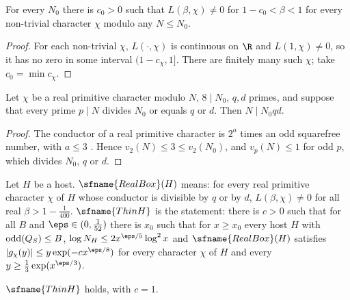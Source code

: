 \begin{lemma}\label{pf:top-supply:smallzeros}
For every $N_0$ there is $c_0>0$ such that $L(\beta,\chi)\ne0$ for $1-c_0<\beta<1$ for every non-trivial character $\chi$
modulo any $N\le N_0$. 
\end{lemma}

\begin{proof}
For each non-trivial $\chi$, $L(\cdot,\chi)$ is continuous on $\R$ and $L(1,\chi)\ne0$, so it has no zero in some interval
$(1-c_\chi,1]$. There are finitely many such $\chi$; take $c_0=\min c_\chi$.
\end{proof}

\begin{lemma}\label{pf:top-supply:realcond}
Let $\chi$ be a real primitive character modulo $N$, $8\mid N_0$, $q,d$ primes, and suppose that every prime $p\mid N$ divides
$N_0$ or equals $q$ or $d$. Then $N\mid N_0qd$. 
\end{lemma}

\begin{proof}
The conductor of a real primitive character is $2^a$ times an odd squarefree number, with $a\le3$
\cite[Ch.~5]{Davenport2000}. Hence $v_2(N)\le3\le v_2(N_0)$, and $v_p(N)\le1$ for odd $p$, which divides $N_0$, $q$ or $d$.
\end{proof}

\begin{definition}\label{pf:top-supply:thinH}
Let $H$ be a host. $\sfname{RealBox}(H)$ means: for every real primitive character $\chi$ of $H$ whose conductor is
divisible by $q$ or by $d$, $L(\beta,\chi)\ne0$ for all real $\beta>1-\frac1{400}$. $\sfname{ThinH}$ is the statement:
there is $c>0$ such that for all $B$ and $\eps\in(0,\frac1{52})$ there is $x_0$ such that for $x\ge x_0$ every host $H$
with $\operatorname{odd}(Q_S)\le B$, $\log N_H\le2x^{\eps/5}\log^2x$ and $\sfname{RealBox}(H)$ satisfies
$|g_\chi(y)|\le y\exp(-cx^{\eps/8})$ for every character $\chi$ of $H$ and every $y\ge\frac13\exp(x^{\eps/3})$.
 
\end{definition}

\begin{proposition}\label{pf:top-supply:thinHprop}
$\sfname{ThinH}$ holds, with $c=1$. 
\end{proposition}

